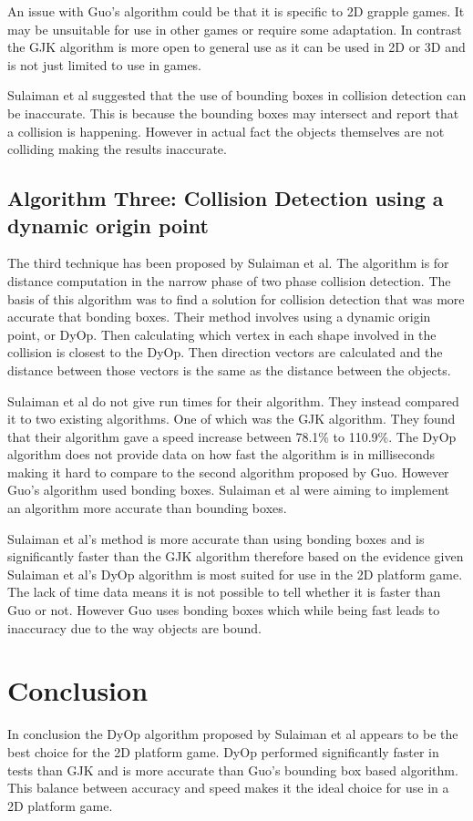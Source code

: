 \documentclass{scrartcl}
\begin{document}
An issue with Guo's algorithm could be that it is specific to 2D grapple games. It may be unsuitable for use in other games or require some adaptation. In contrast the GJK algorithm is more open to general use as it can be used in 2D or 3D and is not just limited to use in games.
	
Sulaiman et al \cite{Sulaiman} suggested that the use of bounding boxes in collision detection can be inaccurate. This is because the bounding boxes may intersect and report that a collision is happening. However in actual fact the objects themselves are not colliding making the results inaccurate.
	
	
\subsection{Algorithm Three: Collision Detection using a dynamic origin point }
The third technique has been proposed by Sulaiman et al.\cite{Sulaiman} The algorithm is for distance computation in the narrow phase of two phase collision detection. The basis of this algorithm was to find a solution for collision detection that was more accurate that bonding boxes. Their method involves using a dynamic origin point, or DyOp. Then calculating which vertex in each shape involved in the collision is closest to the DyOp. Then direction vectors are calculated and the distance between those vectors is the same as the distance between the objects. 
	
Sulaiman et al do not give run times for their algorithm. They instead compared it to two existing algorithms. One of which was the GJK  algorithm. They found that their algorithm gave a speed increase  between 78.1\% to 110.9\%. The DyOp algorithm does not provide data on how fast the algorithm is in milliseconds making it hard to compare to the second algorithm proposed by Guo. However Guo’s algorithm used bonding boxes. Sulaiman et al were aiming to implement an algorithm more accurate than bounding boxes.
	
Sulaiman et al's method is more accurate than using bonding boxes and is significantly faster than the GJK algorithm therefore based on the evidence given Sulaiman et al's DyOp algorithm is most suited for use in the 2D platform game. The lack of time data means it is not possible to tell whether it is faster than Guo or not. However Guo uses bonding boxes which while being fast leads to inaccuracy due to the way objects are bound.  
	
		
	
\section{Conclusion}
In conclusion the DyOp algorithm proposed by Sulaiman et al appears to be the best choice for the 2D platform game. DyOp performed significantly faster in tests than GJK and is more accurate than Guo's bounding box based algorithm. This balance between accuracy and speed makes it the ideal choice for use in a 2D platform game.  
	
	


	
\end{document}
